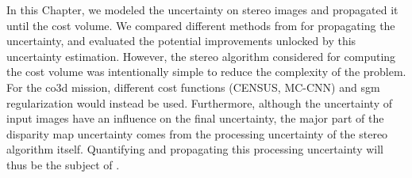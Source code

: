 \begin{conclusion}
    In this Chapter, we modeled the uncertainty on stereo images and propagated it until the cost volume. We compared different methods from  for propagating the uncertainty, and evaluated the potential improvements unlocked by this uncertainty estimation. However, the stereo algorithm considered for computing the cost volume was intentionally simple to reduce the complexity of the problem. For the \acrshort{co3d} mission, different cost functions (CENSUS, MC-CNN) and \acrshort{sgm} regularization would instead be used. Furthermore, although the uncertainty of input images have an influence on the final uncertainty, the major part of the disparity map uncertainty comes from the processing uncertainty of the stereo algorithm itself. Quantifying and propagating this processing uncertainty will thus be the subject of .
\end{conclusion}

\clearpage